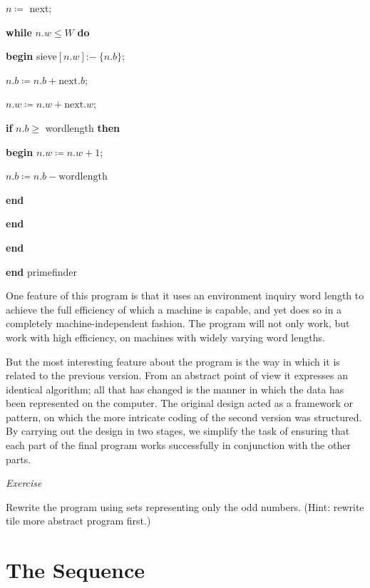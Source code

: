 \documentclass[twoside,11pt]{book}
\begin{document}
\quad \quad \quad \quad $n\coloneq$ next;

\quad \quad \quad \quad \textbf{while} $n.w \leqslant W$ \textbf{do}

\quad \quad \quad \quad \quad \textbf{begin} sieve$[n.w]$:$-\ \{n.b\}$;

\quad \quad \quad \quad \quad \quad $n.b\coloneq n.b + \text{next}.b$;

\quad \quad \quad \quad \quad \quad $n.w\coloneq n. w + \text{next}.w$;

\quad \quad \quad \quad \quad \quad \textbf{if} $n.b \geqslant$ wordlength \textbf{then}

\quad \quad \quad \quad \quad \quad \textbf{begin} $n.w\coloneq n.w + 1$;

\quad \quad \quad \quad \quad \quad \quad $n.b\coloneq n.b - \text{wordlength}$

\quad \quad \quad \quad \quad \quad \textbf{end}

\quad \quad \quad \quad \quad \textbf{end}

\quad \quad \quad \textbf{end}

\quad \textbf{end} primefinder

One feature of this program is that it uses an environment inquiry word length to achieve the full efficiency of which a machine is capable, and yet does so in a completely machine-independent fashion. The program will not only work, but work with high efficiency, on machines with widely varying word lengths.

But the most interesting feature about the program is the way in which it is related to the previous version. From an abstract point of view it expresses an identical algorithm; all that has changed is the manner in which the data has been represented on the computer. The original design acted as a framework or pattern, on which the more intricate coding of the second version was structured. By carrying out the design in two stages, we simplify the task of ensuring that each part of the final program works successfully in conjunction with the other parts.

\noindent
\textit{Exercise}
\nopagebreak

\noindent
Rewrite the program using sets representing only the odd numbers. (Hint: rewrite tile more abstract program first.)

\section[The sequence]{The Sequence}
\end{document}
